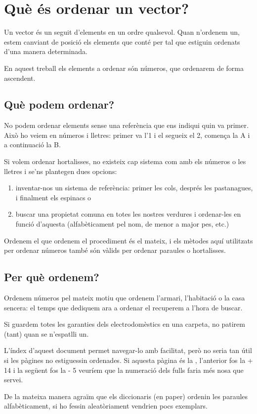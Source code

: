 \chapter{Què és ordenar un vector?}
Un vector és un seguit d'elements en un ordre qualsevol.
Quan n'ordenem un, estem canviant de posició els elements que conté per tal que estiguin ordenats d'una manera determinada.

En aquest treball els elements a ordenar són números, que ordenarem de forma ascendent.

\section{Què podem ordenar?}
No podem ordenar elements sense una referència que ens indiqui quin va primer.
Això ho veiem en números i lletres: primer va l'1 i el segueix el 2, comença la A i a continuació la B.

Si volem ordenar hortalisses, no existeix cap sistema com amb els números o les lletres i se'ns plantegen dues opcions:
\begin{enumerate}[label={\alph*)}]
	\item inventar-nos un sistema de referència: primer les cols, després les pastanagues, i finalment els espinacs o
	\item buscar una propietat comuna en totes les nostres verdures i ordenar-les en funció d'aquesta (alfabèticament pel nom, de menor a major pes, etc.)
\end{enumerate}

Ordenem el que ordenem el procediment és el mateix, i els mètodes aquí utilitzats per ordenar números també són vàlids per ordenar paraules o hortalisses.

\pagebreak
\section{Per què ordenem?}
Ordenem números pel mateix motiu que ordenem l'armari, l'habitació o la casa sencera: el temps que dediquem ara a ordenar el recuperem a l'hora de buscar.

Si guardem totes les garanties dels electrodomèstics en una carpeta, no patirem (tant) quan se n'espatlli un.

L'índex d'aquest document permet navegar-lo amb facilitat, però no seria tan útil si les pàgines no estiguessin ordenades. Si aquesta pàgina és la {\thepage}, l'anterior fos la {\the\numexpr \thepage + 14} i la següent fos la {\the\numexpr \thepage - 5} veuríem que la numeració dels fulls faria més nosa que servei.

De la mateixa manera agraïm que els diccionaris (en paper) ordenin les paraules alfabèticament, si ho fessin aleatòriament vendrien pocs exemplars.